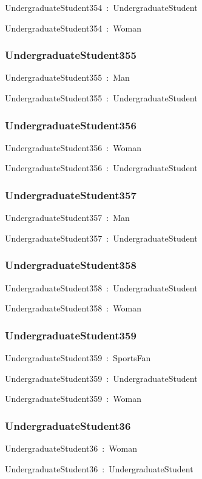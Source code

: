 \documentclass{article}
\begin{document}
UndergraduateStudent354~:~UndergraduateStudent

UndergraduateStudent354~:~Woman

\subsubsection*{UndergraduateStudent355}

UndergraduateStudent355~:~Man

UndergraduateStudent355~:~UndergraduateStudent

\subsubsection*{UndergraduateStudent356}

UndergraduateStudent356~:~Woman

UndergraduateStudent356~:~UndergraduateStudent

\subsubsection*{UndergraduateStudent357}

UndergraduateStudent357~:~Man

UndergraduateStudent357~:~UndergraduateStudent

\subsubsection*{UndergraduateStudent358}

UndergraduateStudent358~:~UndergraduateStudent

UndergraduateStudent358~:~Woman

\subsubsection*{UndergraduateStudent359}

UndergraduateStudent359~:~SportsFan

UndergraduateStudent359~:~UndergraduateStudent

UndergraduateStudent359~:~Woman

\subsubsection*{UndergraduateStudent36}

UndergraduateStudent36~:~Woman

UndergraduateStudent36~:~UndergraduateStudent
\end{document}
